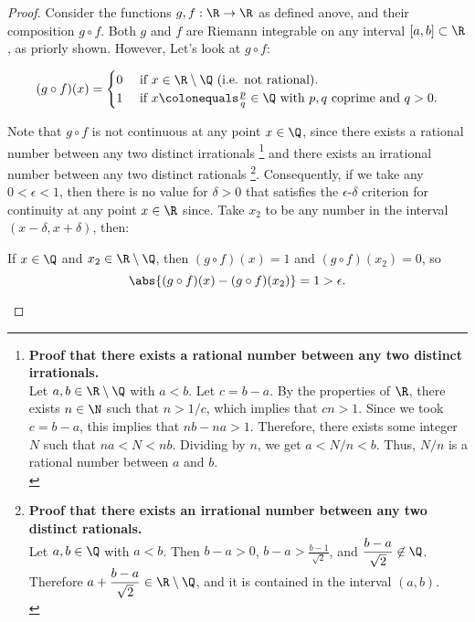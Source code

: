   \begin{proof}
    Consider the functions $g, f : \R \to \R$ as defined anove,
  and their composition $g \circ f$.
  Both $g$ and $f$ are Riemann integrable on any interval $[a, b] \subset \R$,
  as priorly shown. However, Let's look at $g \circ f$:

  \[
    (g \circ f)(x) = \begin{cases}
      0 & \text{ if } x \in \R \setminus \Q \text{ (i.e. not rational).}\\
      1 & \text{ if } x \colonequals \frac{p}{q} \in \Q
      \text{ with $p, q$ coprime and $q > 0$}.
    \end{cases}
  \]


  Note that $g \circ f$ is not continuous at any point $x \in \Q$,
  since there exists a rational number between any two distinct irrationals
  \footnote{
    \textbf{Proof that there exists a rational number between any two distinct irrationals.} \\
    Let $a, b \in \R \setminus \Q$ with $a < b$.
    Let $c = b - a$. By the properties of $\R$, there exists $n \in \N$
    such that $n > 1/c$, which implies that $cn > 1$.
    Since we took $c = b - a$, this implies that $nb - na > 1$.
    Therefore, there exists some integer $N$ such that $na < N < nb$.
    Dividing by $n$, we get $a < N/n < b$.
    Thus, $N/n$ is a rational number between $a$ and $b$. \\
  }
  and there exists an irrational number between any two distinct rationals
  \footnote {
    \textbf{Proof that there exists an irrational number between any two distinct rationals.} \\
    Let $a, b \in \Q$ with $a < b$.
    Then $b - a > 0$, $\displaystyle b - a > \frac{b-1}{\sqrt{2}}$,
    and $\displaystyle \frac{b - a}{\sqrt{2}} \not \in \Q$.
    Therefore $\displaystyle a + \frac{b - a}{\sqrt{2}} \in \R \setminus \Q$, and it is contained
    in the interval $(a, b)$. \\
  }.
  Consequently, if we take any $0 < \epsilon < 1$, then there is no value
  for $\delta > 0$ that satisfies the $\epsilon$-$\delta$ criterion for continuity
  at any point $x \in \R$ since. Take $x_2$ to be any number in the interval
  $(x - \delta, x + \delta)$, then:
  \begin{enumarabic}
    \item If $x \in \Q$ and $x_2 \in \R \setminus \Q$, then
      $(g \circ f)(x) = 1$ and $(g \circ f)(x_2) = 0$,
      so \[ \abs{(g \circ f)(x) - (g \circ f)(x_2)} = 1 > \epsilon. \]

\end{enumarabic}
\end{proof}
